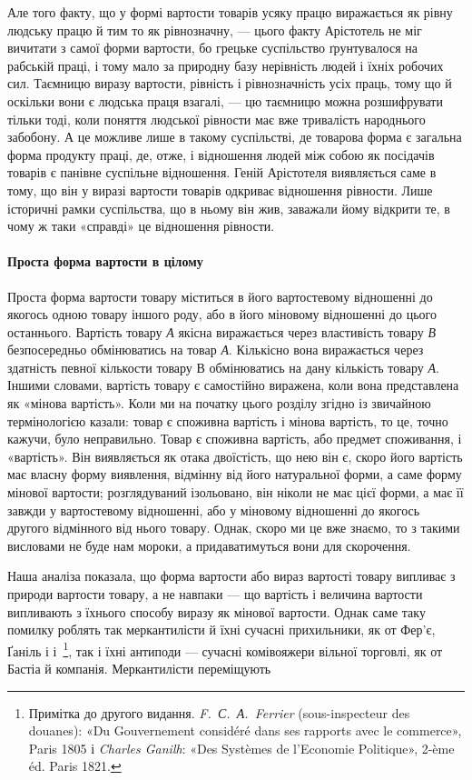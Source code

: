 Але того факту, що у формі вартости товарів усяку працю виражається
як рівну людську працю й тим то як рівнозначну, —
цього факту Арістотель не міг вичитати з самої форми вартости,
бо грецьке суспільство ґрунтувалося на рабській праці, і тому
мало за природну базу нерівність людей і їхніх робочих сил.
Таємницю виразу вартости, рівність і рівнозначність усіх праць,
тому що й оскільки вони є людська праця взагалі, — цю таємницю
можна розшифрувати тільки тоді, коли поняття людської рівности
має вже тривалість народнього забобону. А це можливе лише в
такому суспільстві, де товарова форма є загальна форма продукту
праці, де, отже, і відношення людей між собою як посідачів товарів
є панівне суспільне відношення. Геній Арістотеля виявляється
саме в тому, що він у виразі вартости товарів одкриває відношення
рівности. Лише історичні рамки суспільства, що в ньому він жив,
заважали йому відкрити те, в чому ж таки «справді» це відношення
рівности.

\paragraph{Проста форма вартости в цілому}

Проста форма вартости товару міститься в його вартостевому
відношенні до якогось одною товару іншого роду, або в його міновому
відношенні до цього останнього. Вартість товару \emph{А} якісна
виражається через властивість товару \emph{В} безпосередньо обмінюватись
на товар \emph{А}. Кількісно вона виражається через здатність
певної кількости товару В обмінюватись на дану кількість товару
\emph{А}. Іншими словами, вартість товару є самостійно виражена, коли
вона представлена як «мінова вартість». Коли ми на початку цього
розділу згідно із звичайною термінологією казали: товар є споживна
вартість і мінова вартість, то це, точно кажучи, було неправильно.
Товар є споживна вартість, або предмет споживання, і
«вартість». Він виявляється як отака двоїстість, що нею він є,
скоро його вартість має власну форму виявлення, відмінну від
його натуральної форми, а саме форму мінової вартости; розглядуваний
ізольовано, він ніколи не має цієї форми, а має її завжди
у вартостевому відношенні, або у міновому відношенні до якогось
другого відмінного від нього товару. Однак, скоро ми це вже
знаємо, то з такими висловами не буде нам мороки, а придаватимуться
вони для скорочення.

Наша аналіза показала, що форма вартости або вираз вартості
товару випливає з природи вартости товару, а не навпаки — що
вартість і величина вартости випливають з їхнього способу виразу
як мінової вартости. Однак саме таку помилку роблять так меркантилісти
й їхні сучасні прихильники, як от Фер’є, Ґаніль і
і~\footnote{
Примітка до другого видання. \emph{F.~С.~А.~Ferrier} (sous-inspecteur
des douanes): «Du Gouvernement considéré dans ses rapports avec
le commerce», Paris 1805 і \emph{Charles Ganilh}: «Des Systèmes de l’Economie
Politique», 2-ème éd. Paris 1821.
}, так і їхні антиподи — сучасні комівояжери вільної торговлі,
як от Бастіа й компанія. Меркантилісти переміщують
\parbreak{}  %
